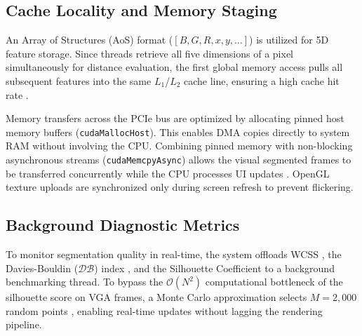 \subsection{Cache Locality and Memory Staging}
An Array of Structures (AoS) format ($[B, G, R, x, y, \dots]$) is utilized for 5D feature storage. Since threads retrieve all five dimensions of a pixel simultaneously for distance evaluation, the first global memory access pulls all subsequent features into the same $L_1$/$L_2$ cache line, ensuring a high cache hit rate \cite{CudaGuide, cook2012cuda}.

Memory transfers across the PCIe bus are optimized by allocating pinned host memory buffers (\texttt{cudaMallocHost}). This enables DMA copies directly to system RAM without involving the CPU. Combining pinned memory with non-blocking asynchronous streams (\texttt{cudaMemcpyAsync}) allows the visual segmented frames to be transferred concurrently while the CPU processes UI updates \cite{CudaGuide, cook2012cuda}. OpenGL texture uploads are synchronized only during screen refresh to prevent flickering.

\subsection{Background Diagnostic Metrics}
To monitor segmentation quality in real-time, the system offloads WCSS \cite{krzanowski1988criterion}, the Davies-Bouldin ($\mathcal{D}\mathcal{B}$) index \cite{davies1979cluster, xiao2017davies}, and the Silhouette Coefficient \cite{rousseeuw1987silhouettes} to a background benchmarking thread. To bypass the $\mathcal{O}(N^2)$ computational bottleneck of the silhouette score on VGA frames, a Monte Carlo approximation selects $M=2,000$ random points \cite{shutaywi2021silhouette}, enabling real-time updates without lagging the rendering pipeline.

